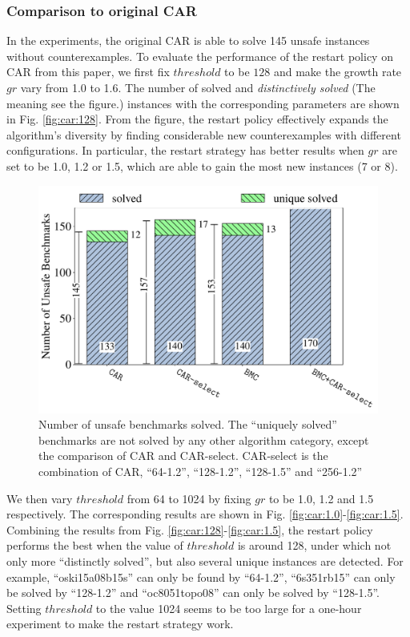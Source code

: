 \subsubsection{Comparison to original CAR}
In the experiments, the original CAR is able to solve 145 unsafe instances without counterexamples.
To evaluate the performance of the restart policy on CAR from this paper, we first fix $threshold$ to be $128$ and make the growth rate $gr$ vary from 1.0 to 1.6. The number of solved and \emph{distinctively solved} (The meaning see the figure.) instances with the corresponding parameters are shown in Fig. \ref{fig:car:128}. From the figure, the restart policy effectively expands the algorithm's diversity by finding considerable new counterexamples with different configurations. In particular, the restart strategy has better results when $gr$ are set to be 1.0, 1.2 or 1.5, which are able to gain the most new instances (7 or 8). 
\begin{figure}[!t]
\centering
\includegraphics[width=\linewidth]{images/car-bmc.pdf} 
\caption{Number of unsafe benchmarks solved. The “uniquely solved” benchmarks are not solved by any other algorithm category, except the comparison of CAR and CAR-select. CAR-select is the combination of CAR, ``64-1.2'', ``128-1.2'', ``128-1.5'' and ``256-1.2''}\label{fig:compare}
\end{figure}

We then vary $threshold$ from 64 to 1024 by fixing $gr$ to be 1.0, 1.2 and 1.5 respectively. The corresponding results are shown in 
Fig. \ref{fig:car:1.0}-\ref{fig:car:1.5}. Combining the results from Fig. \ref{fig:car:128}-\ref{fig:car:1.5}, the restart policy performs the best when the value of $threshold$ is around 128, under which not only more ``distinctly solved'', but also several unique instances are detected. For example, ``oski15a08b15s'' can only be found by ``64-1.2'', ``6s351rb15'' can only be solved by ``128-1.2'' and ``oc8051topo08'' can only be solved by ``128-1.5''. Setting $threshold$ to the value 1024 seems to be too large for a one-hour experiment to make the restart strategy work. 

